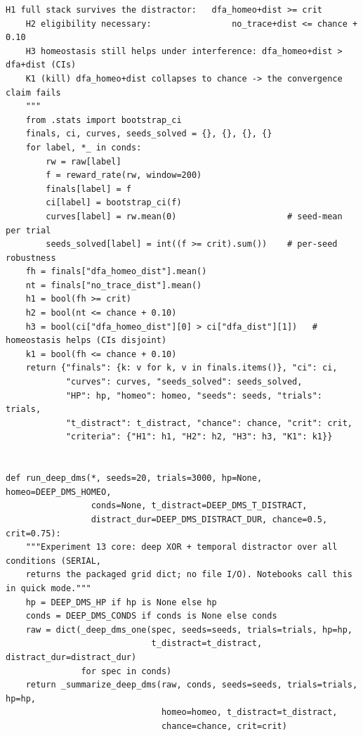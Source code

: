 \begin{lstlisting}[caption={mrl\_trace/deep.py},label={lst:siox-src-deep}]
    H1 full stack survives the distractor:   dfa_homeo+dist >= crit
    H2 eligibility necessary:                no_trace+dist <= chance + 0.10
    H3 homeostasis still helps under interference: dfa_homeo+dist > dfa+dist (CIs)
    K1 (kill) dfa_homeo+dist collapses to chance -> the convergence claim fails
    """
    from .stats import bootstrap_ci
    finals, ci, curves, seeds_solved = {}, {}, {}, {}
    for label, *_ in conds:
        rw = raw[label]
        f = reward_rate(rw, window=200)
        finals[label] = f
        ci[label] = bootstrap_ci(f)
        curves[label] = rw.mean(0)                      # seed-mean per trial
        seeds_solved[label] = int((f >= crit).sum())    # per-seed robustness
    fh = finals["dfa_homeo_dist"].mean()
    nt = finals["no_trace_dist"].mean()
    h1 = bool(fh >= crit)
    h2 = bool(nt <= chance + 0.10)
    h3 = bool(ci["dfa_homeo_dist"][0] > ci["dfa_dist"][1])   # homeostasis helps (CIs disjoint)
    k1 = bool(fh <= chance + 0.10)
    return {"finals": {k: v for k, v in finals.items()}, "ci": ci,
            "curves": curves, "seeds_solved": seeds_solved,
            "HP": hp, "homeo": homeo, "seeds": seeds, "trials": trials,
            "t_distract": t_distract, "chance": chance, "crit": crit,
            "criteria": {"H1": h1, "H2": h2, "H3": h3, "K1": k1}}


def run_deep_dms(*, seeds=20, trials=3000, hp=None, homeo=DEEP_DMS_HOMEO,
                 conds=None, t_distract=DEEP_DMS_T_DISTRACT,
                 distract_dur=DEEP_DMS_DISTRACT_DUR, chance=0.5, crit=0.75):
    """Experiment 13 core: deep XOR + temporal distractor over all conditions (SERIAL,
    returns the packaged grid dict; no file I/O). Notebooks call this in quick mode."""
    hp = DEEP_DMS_HP if hp is None else hp
    conds = DEEP_DMS_CONDS if conds is None else conds
    raw = dict(_deep_dms_one(spec, seeds=seeds, trials=trials, hp=hp,
                             t_distract=t_distract, distract_dur=distract_dur)
               for spec in conds)
    return _summarize_deep_dms(raw, conds, seeds=seeds, trials=trials, hp=hp,
                               homeo=homeo, t_distract=t_distract,
                               chance=chance, crit=crit)



\end{lstlisting}
